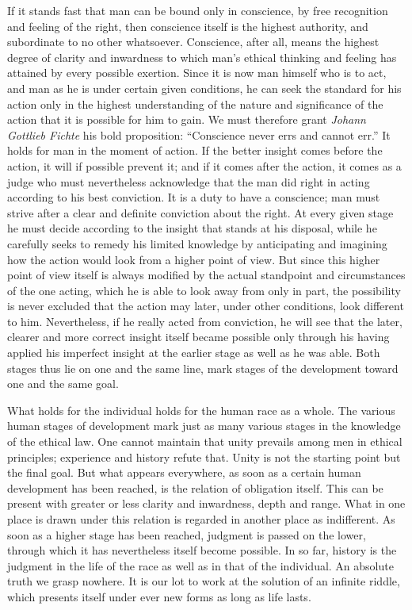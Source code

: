 \documentclass[12pt,a4paper,openany]{book}
\newcommand{\opage}[1]{\marginnote{\footnotesize\textit{[#1]}}}
\begin{document}
If it stands fast that man can be bound only in conscience, by free
recognition and feeling of the right, then conscience itself is the
highest authority, and subordinate to no other whatsoever. Conscience, after
all, means the highest degree of clarity and inwardness to which man's
ethical thinking and feeling has attained by every possible exertion. Since
it is now man himself who is to act, and man as he is under certain given
conditions, he can seek the standard for his action only in the highest
understanding of the nature and significance of the action that it is
possible for him to gain. We must therefore grant \emph{Johann Gottlieb
Fichte} his bold proposition: ``Conscience never errs and cannot err.'' It
holds for man in the moment of action. If the better insight comes before
the action, it will if possible prevent it; and if it comes after the
action, it comes as a judge who must nevertheless acknowledge that the man
did right in acting according to his best conviction. It is a duty to have
a conscience; man must strive after a clear and definite conviction about
the right. At every given stage he must decide according to the insight
that \opage{91}stands at his disposal, while he carefully seeks to remedy
his limited knowledge by anticipating and imagining how the action would
look from a higher point of view. But since this higher point of view
itself is always modified by the actual standpoint and circumstances of the
one acting, which he is able to look away from only in part, the
possibility is never excluded that the action may later, under other
conditions, look different to him. Nevertheless, if he really acted from
conviction, he will see that the later, clearer and more correct insight
itself became possible only through his having applied his imperfect
insight at the earlier stage as well as he was able. Both stages thus lie
on one and the same line, mark stages of the development toward one and
the same goal.

What holds for the individual holds for the human race as a whole. The
various human stages of development mark just as many various stages in
the knowledge of the ethical law. One cannot maintain that unity prevails
among men in ethical principles; experience and history refute that. Unity
is not the starting point but the final goal. But what appears everywhere,
as soon as a certain human development has been reached, is the relation
of obligation itself. This can be present with greater or less clarity and
inwardness, depth and range. What in one place is drawn under this
relation is regarded in another place as indifferent. As soon as a higher
stage has been reached, judgment is passed on the \opage{92}lower, through
which it has nevertheless itself become possible. In so far, history is
the judgment in the life of the race as well as in that of the individual.
An absolute truth we grasp nowhere. It is our lot to work at the solution
of an infinite riddle, which presents itself under ever new forms as long
as life lasts.
\end{document}
